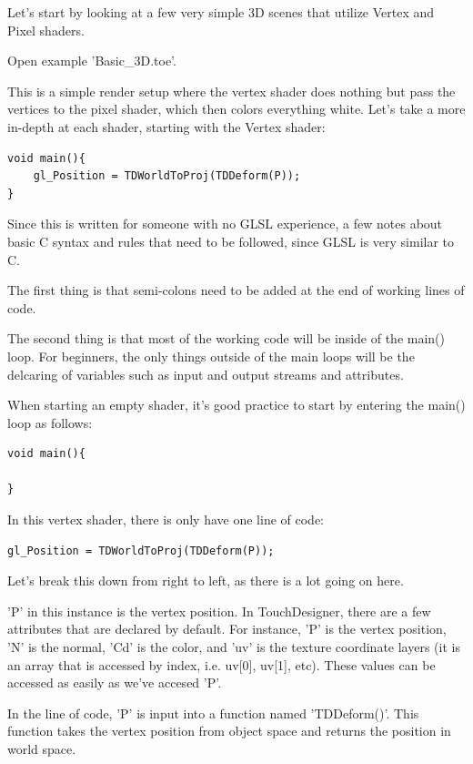 \begin{fullwidth}
Let's start by looking at a few very simple 3D scenes that utilize Vertex and Pixel shaders. 

Open example 'Basic\_3D.toe'. 

This is a simple render setup where the vertex shader does nothing but pass the vertices to the pixel shader, which then colors everything white. Let's take a more in-depth at each shader, starting with the Vertex shader:

\begin{lstlisting}
void main(){
	gl_Position = TDWorldToProj(TDDeform(P));
}
\end{lstlisting}

Since this is written for someone with no GLSL experience, a few notes about basic C syntax and rules that need to be followed, since GLSL is very similar to C.

The first thing is that semi-colons need to be added at the end of working lines of code. 

The second thing is that most of the working code will be inside of the main() loop. For beginners, the only things outside of the main loops will be the delcaring of variables such as input and output streams and attributes. 

When starting an empty shader, it's good practice to start by entering the main() loop as follows:

\begin{lstlisting}
void main(){
	
}
\end{lstlisting}

In this vertex shader, there is only have one line of code:

\begin{lstlisting}
gl_Position = TDWorldToProj(TDDeform(P));
\end{lstlisting}

Let's break this down from right to left, as there is a lot going on here. 

'P' in this instance is the vertex position. In TouchDesigner, there are a few attributes that are declared by default. For instance, 'P' is the vertex position, 'N' is the normal, 'Cd' is the color, and 'uv' is the texture coordinate layers (it is an array that is accessed by index, i.e. uv[0], uv[1], etc). These values can be accessed as easily as we've accesed 'P'.

In the line of code, 'P' is input into a function named 'TDDeform()'. This function takes the vertex position from object space and returns the position in world space. 


\end{fullwidth}
